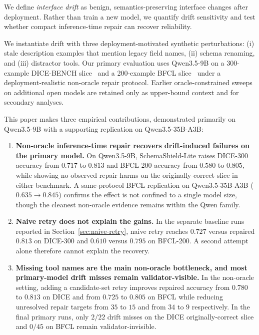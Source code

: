 \documentclass{llncs}
\newcommand{\method}{SchemaShield-Lite\xspace}
\begin{document}
We define \emph{interface drift} as benign, semantics-preserving interface changes
after deployment. Rather than train a new model, we quantify drift sensitivity and
test whether compact inference-time repair can recover reliability.

We instantiate drift with three deployment-motivated synthetic perturbations: (i)
stale description examples that mention legacy field names, (ii) schema renaming,
and (iii) distractor tools. Our primary evaluation uses Qwen3.5-9B on a
300-example DICE-BENCH slice~\cite{jang2025dicebench} and a 200-example BFCL
slice~\cite{bfcl2024} under a deployment-realistic non-oracle repair protocol.
Earlier oracle-constrained sweeps on additional open models are retained only as
upper-bound context and for secondary analyses.

This paper makes three empirical contributions, demonstrated primarily on
Qwen3.5-9B with a supporting replication on Qwen3.5-35B-A3B:

\begin{enumerate}
\item \textbf{Non-oracle inference-time repair recovers drift-induced failures on
the primary model.} On Qwen3.5-9B, \method raises DICE-300 accuracy from $0.717$
to $0.813$ and BFCL-200 accuracy from $0.580$ to $0.805$, while showing no
observed repair harms on the originally-correct slice in either benchmark. A
same-protocol BFCL replication on Qwen3.5-35B-A3B ($0.635 \rightarrow 0.845$)
confirms the effect is not confined to a single model size, though the cleanest
non-oracle evidence remains within the Qwen family.

\item \textbf{Naive retry does not explain the gains.} In the separate baseline
runs reported in Section~\ref{sec:naive-retry}, naive retry reaches $0.727$
versus repaired $0.813$ on DICE-300 and $0.610$ versus $0.795$ on BFCL-200.
A second attempt alone therefore cannot explain the recovery.

\item \textbf{Missing tool names are the main non-oracle bottleneck, and most
primary-model drift misses remain validator-visible.} In the non-oracle setting,
adding a candidate-set retry improves repaired accuracy from $0.780$ to $0.813$ on
DICE and from $0.725$ to $0.805$ on BFCL while reducing unresolved repair targets
from $35$ to $15$ and from $34$ to $9$ respectively. In the final primary runs,
only $2/22$ drift misses on the DICE originally-correct slice and $0/45$ on BFCL
remain validator-invisible.
\end{enumerate}
\end{document}
